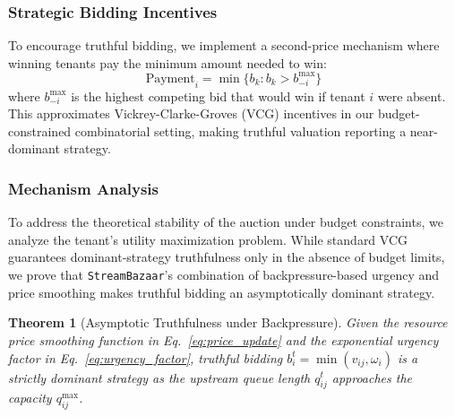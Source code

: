 \documentclass[lettersize,journal]{IEEEtran}
\newtheorem{theorem}{Theorem}
\begin{document}
\subsubsection{Strategic Bidding Incentives}
\label{ssub:bidding_incentives}

To encourage truthful bidding, we implement a second-price mechanism where winning tenants pay the minimum amount needed to win:
\begin{equation}
\label{eq:payment}
\text{Payment}_i = \min\{b_k : b_k > b_{-i}^{\max}\}
\end{equation}
where $b_{-i}^{\max}$ is the highest competing bid that would win if tenant $i$ were absent. This approximates Vickrey-Clarke-Groves (VCG) \cite{vickrey1961counterspeculation,clarke1971multipart,lahaie2025iterative} incentives in our budget-constrained combinatorial setting, making truthful valuation reporting a near-dominant strategy.

\subsubsection{Mechanism Analysis}
\label{ssub:mechanism_analysis}

To address the theoretical stability of the auction under budget constraints, we analyze the tenant's utility maximization problem. While standard VCG guarantees dominant-strategy truthfulness only in the absence of budget limits, we prove that \texttt{StreamBazaar}'s combination of backpressure-based urgency and price smoothing makes truthful bidding an asymptotically dominant strategy.

\begin{theorem}[Asymptotic Truthfulness under Backpressure]
Given the resource price smoothing function in Eq.~\ref{eq:price_update} and the exponential urgency factor in Eq.~\ref{eq:urgency_factor}, truthful bidding $b_i^t = \min(v_{ij}, \omega_i)$ is a strictly dominant strategy as the upstream queue length $q_{ij}^t$ approaches the capacity $q_{ij}^{\max}$.
\end{theorem}
\end{document}

